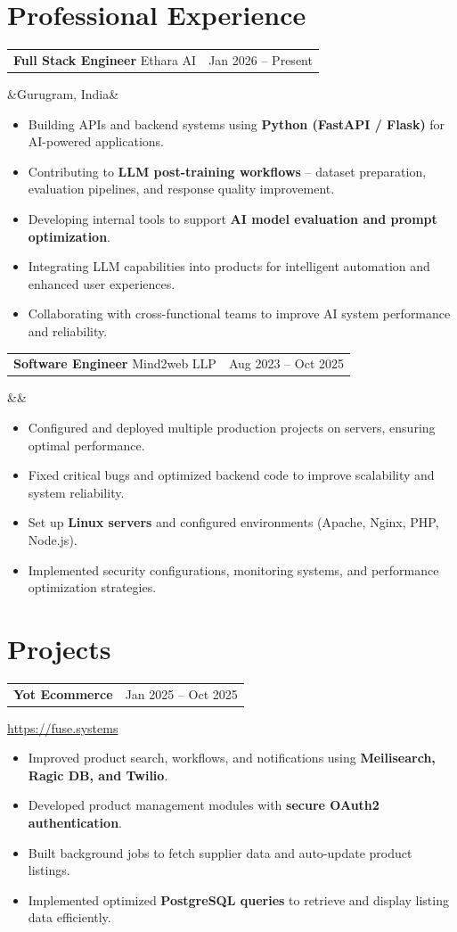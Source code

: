 \documentclass[10.5pt, a4paper]{article}
\makeatletter
\newcommand{\expentry}[4]{%
  \vspace{0.5pt}%
  \begin{tabularx}{\linewidth}{@{} X r @{}}
    {\fontsize{10pt}{12pt}\selectfont\bfseries\color{cvdark} #1}
    \enspace{\textcolor[RGB]{195,210,228}{$|$}}\enspace
    {\fontsize{9pt}{11pt}\selectfont\color{cvgray} #2}
    &
    {\fontsize{8.5pt}{10pt}\selectfont\color{cvgray} #3}
  \end{tabularx}%
  \ifx&#4&\else
    \par\vspace{0.5pt}{\fontsize{8.5pt}{10pt}\selectfont\color{cvgray} #4}%
  \fi
  \vspace{1pt}%
}
\newcommand{\projentry}[3]{%
  \vspace{0.5pt}%
  \begin{tabularx}{\linewidth}{@{} X r @{}}
    {\fontsize{10pt}{12pt}\selectfont\bfseries\color{cvdark} #1}
    &
    {\fontsize{8.5pt}{10pt}\selectfont\color{cvgray} #2}
  \end{tabularx}%
  \par\vspace{0.5pt}%
  {\fontsize{8.5pt}{10pt}\selectfont\color{cvsteel}\href{#3}{#3}}%
  \vspace{1pt}%
}
\makeatother
\begin{document}
\section{Professional Experience}

\expentry{Full Stack Engineer}{Ethara AI}{Jan 2026 -- Present}{Gurugram, India}
{\fontsize{9pt}{11.5pt}\selectfont
\begin{itemize}
  \item Building APIs and backend systems using \textbf{Python (FastAPI / Flask)} for AI-powered applications.
  \item Contributing to \textbf{LLM post-training workflows} -- dataset preparation, evaluation pipelines, and response quality improvement.
  \item Developing internal tools to support \textbf{AI model evaluation and prompt optimization}.
  \item Integrating LLM capabilities into products for intelligent automation and enhanced user experiences.
  \item Collaborating with cross-functional teams to improve AI system performance and reliability.
\end{itemize}
}

\vspace{1pt}

\expentry{Software Engineer}{Mind2web LLP}{Aug 2023 -- Oct 2025}{}
{\fontsize{9pt}{11.5pt}\selectfont
\begin{itemize}
  \item Configured and deployed multiple production projects on servers, ensuring optimal performance.
  \item Fixed critical bugs and optimized backend code to improve scalability and system reliability.
  \item Set up \textbf{Linux servers} and configured environments (Apache, Nginx, PHP, Node.js).
  \item Implemented security configurations, monitoring systems, and performance optimization strategies.
\end{itemize}
}

\section{Projects}

\projentry{Yot Ecommerce}{Jan 2025 -- Oct 2025}{https://fuse.systems}
{\fontsize{9pt}{11.5pt}\selectfont
\begin{itemize}
  \item Improved product search, workflows, and notifications using \textbf{Meilisearch, Ragic DB, and Twilio}.
  \item Developed product management modules with \textbf{secure OAuth2 authentication}.
  \item Built background jobs to fetch supplier data and auto-update product listings.
  \item Implemented optimized \textbf{PostgreSQL queries} to retrieve and display listing data efficiently.
\end{itemize}
}
\end{document}
